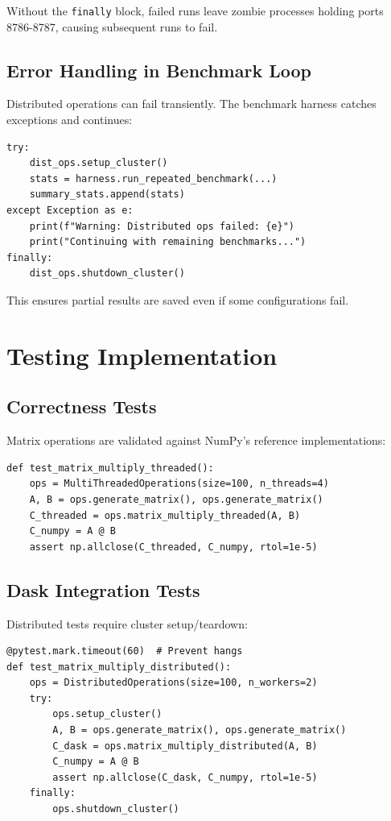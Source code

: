 Without the \texttt{finally} block, failed runs leave zombie processes holding ports 8786-8787, causing subsequent runs to fail.

\subsection{Error Handling in Benchmark Loop}

Distributed operations can fail transiently. The benchmark harness catches exceptions and continues:

\begin{verbatim}
try:
    dist_ops.setup_cluster()
    stats = harness.run_repeated_benchmark(...)
    summary_stats.append(stats)
except Exception as e:
    print(f"Warning: Distributed ops failed: {e}")
    print("Continuing with remaining benchmarks...")
finally:
    dist_ops.shutdown_cluster()
\end{verbatim}

This ensures partial results are saved even if some configurations fail.

\section{Testing Implementation}

\subsection{Correctness Tests}

Matrix operations are validated against NumPy's reference implementations:

\begin{verbatim}
def test_matrix_multiply_threaded():
    ops = MultiThreadedOperations(size=100, n_threads=4)
    A, B = ops.generate_matrix(), ops.generate_matrix()
    C_threaded = ops.matrix_multiply_threaded(A, B)
    C_numpy = A @ B
    assert np.allclose(C_threaded, C_numpy, rtol=1e-5)
\end{verbatim}

\subsection{Dask Integration Tests}

Distributed tests require cluster setup/teardown:

\begin{verbatim}
@pytest.mark.timeout(60)  # Prevent hangs
def test_matrix_multiply_distributed():
    ops = DistributedOperations(size=100, n_workers=2)
    try:
        ops.setup_cluster()
        A, B = ops.generate_matrix(), ops.generate_matrix()
        C_dask = ops.matrix_multiply_distributed(A, B)
        C_numpy = A @ B
        assert np.allclose(C_dask, C_numpy, rtol=1e-5)
    finally:
        ops.shutdown_cluster()
\end{verbatim}


